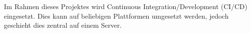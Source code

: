 Im Rahmen dieses Projektes wird Continuous Integration/Development (CI/CD) eingesetzt.
Dies kann auf beliebigen Plattformen umgesetzt werden, jedoch geschieht dies zentral auf einem Server.

